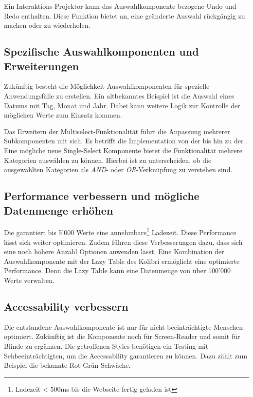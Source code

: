 Ein Interaktions-Projektor kann das Auswahlkomponente bezogene Undo und Redo enthalten. 
Diese Funktion bietet an, eine geänderte Auswahl rückgängig zu machen oder zu wiederholen. 


\subsection{Spezifische Auswahlkomponenten und Erweiterungen}
\label{sec:specificComponents}

Zukünftig besteht die Möglichkeit Auswahlkomponenten für spezielle Anwendungsfälle zu erstellen. 
Ein altbekanntes Beispiel ist die Auswahl eines Datums mit Tag, Monat und Jahr. 
Dabei kann weitere Logik zur Kontrolle der möglichen Werte zum Einsatz kommen. 

Das Erweitern der Multiselect-Funktionalität führt die Anpassung mehrerer Subkomponenten mit sich. 
Es betrifft die Implementation von der  bis hin zu der . 
Eine mögliche neue Single-Select Komponente bietet die Funktionalität mehrere Kategorien auswählen zu können. 
Hierbei ist zu unterscheiden, ob die ausgewählten Kategorien als \emph{AND}- oder \emph{OR}-Verknüpfung zu verstehen sind. 


\subsection{Performance verbessern und mögliche Datenmenge erhöhen}
\label{sec:betterPerformance}

Die  garantiert bis 5'000 Werte eine annehmbare\footnote{
    Ladezeit < 500ms bis die Webseite fertig geladen ist
} Ladezeit. 
Diese Performance lässt sich weiter optimieren. 
Zudem führen diese Verbesserungen dazu, dass sich eine noch höhere Anzahl Optionen anwenden lässt. 
Eine Kombination der Auswahlkomponente mit der Lazy Table des Kolibri ermöglicht eine optimierte Performance. 
Denn die Lazy Table kann eine Datenmenge von über 100'000 Werte verwalten. 


\subsection{Accessability verbessern}
\label{sec:betterAccessability}

Die entstandene Auswahlkomponente ist nur für nicht beeinträchtigte Menschen optimiert. 
Zukünftig ist die Komponente noch für Screen-Reader und somit für Blinde zu ergänzen. 
Die getroffenen Styles benötigen ein Testing mit Sehbeeinträchtigten, um die Accessability garantieren zu können. 
Dazu zählt zum Beispiel die bekannte Rot-Grün-Schwäche. 



